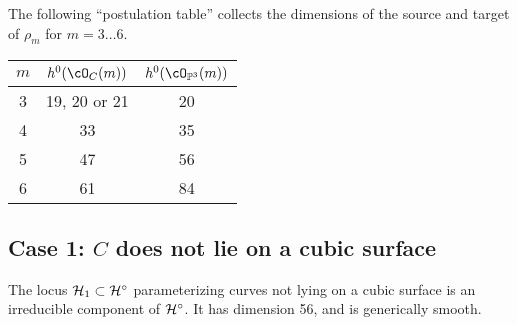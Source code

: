  The following ``postulation table''
collects the dimensions of the source and target of  $\rho_m$ for $m = 3\dots 6$. 
\begin{center}\label{postulation table}
\begin{tabular}{ c | c | c }
 $m$ & $h^0(\cO_C(m))$ & $h^0(\cO_{\PP^3}(m))$ \\
 \hline
 3 & 19, 20 or 21 & 20 \\
 4 & 33 & 35 \\
 5 & 47 & 56 \\
 6 & 61 & 84
\end{tabular}
\end{center}

\subsection{Case 1: $C$ does not lie on a cubic surface}

\begin{proposition}
The locus $\cH_1 \subset \cH^\circ$ parameterizing curves not lying on a cubic surface is an irreducible component of  $\cH^\circ$. It has dimension 56, and is generically smooth.
\end{proposition} 
 
